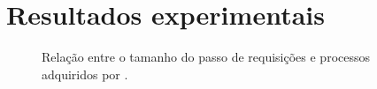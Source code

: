 \chapter{Resultados experimentais~\label{chp:Resultados-Experimentais}}

\begin{figure}[htb]
    \caption{%
        Relação entre o tamanho do passo de requisições e processos adquiridos
        por .
    }
    \label{gra:tempos-tamanhos-de-passo-async}
\end{figure}

